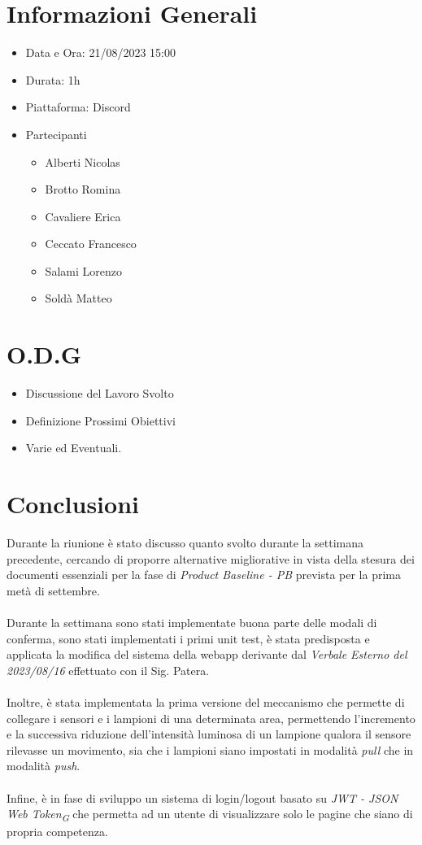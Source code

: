 \documentclass[a4paper, 12pt]{article}
\begin{document}
\makefrontpage

\section*{Informazioni Generali}
\begin{itemize}
    \item Data e Ora: 21/08/2023 15:00
    \item Durata: 1h
    \item Piattaforma: Discord
    \item Partecipanti
    \begin{itemize}
        \item Alberti Nicolas
        \item Brotto Romina
        \item Cavaliere Erica
        \item Ceccato Francesco
        \item Salami Lorenzo
        \item Soldà Matteo
    \end{itemize}
\end{itemize}

\section*{O.D.G}
\begin{itemize}
    \item Discussione del Lavoro Svolto
    \item Definizione Prossimi Obiettivi
    \item Varie ed Eventuali.
\end{itemize}

\section*{Conclusioni}
Durante la riunione è stato discusso quanto svolto durante la settimana precedente, cercando di proporre alternative migliorative in vista della stesura dei documenti essenziali per la fase di \textit{Product Baseline - PB} prevista per la prima metà di settembre.\\\\
Durante la settimana sono stati implementate buona parte delle modali di conferma, sono stati implementati i primi unit test, è stata predisposta e applicata la modifica del sistema della webapp derivante dal \textit{Verbale Esterno del 2023/08/16} effettuato con il Sig. Patera.\\\\
Inoltre, è stata implementata la prima versione del meccanismo che permette di collegare i sensori e i lampioni di una determinata area, permettendo l'incremento e la successiva riduzione dell'intensità luminosa di un lampione qualora il sensore rilevasse un movimento, sia che i lampioni siano impostati in modalità \textit{pull} che in modalità \textit{push}. \\\\
Infine, è in fase di sviluppo un sistema di login/logout basato su \textit{JWT - JSON Web Token\textsubscript{G}} che permetta ad un utente di visualizzare solo le pagine che siano di propria competenza. 
\end{document}
